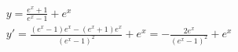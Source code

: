 \begin{ex}
\begin{align}
&y=\frac{e^x+1}{e^x-1}+e^x\nonumber\\
&y'=\frac{(e^x-1)e^x-(e^x+1)e^x}{(e^x-1)^2}+e^x=-\frac{2e^x}{(e^x-1)^2}+e^x\nonumber
\end{align}
\end{ex}